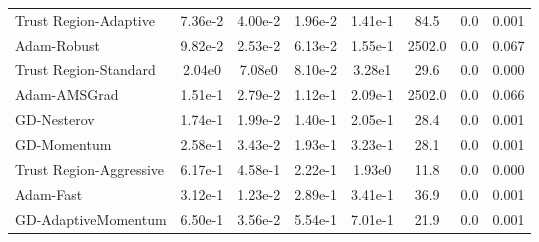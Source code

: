 \documentclass{article}
\begin{document}
\begin{table}[htbp]
{\begin{tabular}{p{2.5cm}*{7}{c}}
Trust Region-Adaptive & 7.36e-2 & 4.00e-2 & 1.96e-2 & 1.41e-1 & 84.5 & 0.0 & 0.001 \\
Adam-Robust & 9.82e-2 & 2.53e-2 & 6.13e-2 & 1.55e-1 & 2502.0 & 0.0 & 0.067 \\
Trust Region-Standard & 2.04e0 & 7.08e0 & 8.10e-2 & 3.28e1 & 29.6 & 0.0 & 0.000 \\
Adam-AMSGrad & 1.51e-1 & 2.79e-2 & 1.12e-1 & 2.09e-1 & 2502.0 & 0.0 & 0.066 \\
GD-Nesterov & 1.74e-1 & 1.99e-2 & 1.40e-1 & 2.05e-1 & 28.4 & 0.0 & 0.001 \\
GD-Momentum & 2.58e-1 & 3.43e-2 & 1.93e-1 & 3.23e-1 & 28.1 & 0.0 & 0.001 \\
Trust Region-Aggressive & 6.17e-1 & 4.58e-1 & 2.22e-1 & 1.93e0 & 11.8 & 0.0 & 0.000 \\
Adam-Fast & 3.12e-1 & 1.23e-2 & 2.89e-1 & 3.41e-1 & 36.9 & 0.0 & 0.001 \\
GD-AdaptiveMomentum & 6.50e-1 & 3.56e-2 & 5.54e-1 & 7.01e-1 & 21.9 & 0.0 & 0.001 \\
\bottomrule
\end{tabular}
}
\end{table}
\end{document}

